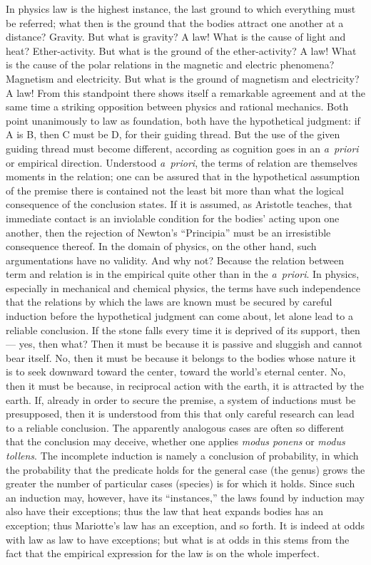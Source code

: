 \documentclass[12pt]{book}
\begin{document}
In physics law is the highest instance, the last ground to which everything must be
referred; what then is the ground that the bodies attract one another at a distance?
Gravity. But what is gravity? A law! What is the cause of light and heat? Ether-activity.
But what is the ground of the ether-activity? A law! What is the cause of the polar
relations in the magnetic and electric phenomena? Magnetism and electricity. But what
is the ground of magnetism and electricity? A law! From this standpoint there shows
itself a remarkable agreement and at the same time a striking opposition between physics
and rational mechanics. Both point unanimously to law as foundation, both have the
hypothetical judgment: if A is B, then C must be D, for their guiding thread. But the
use of the given guiding thread must become different, according as cognition goes in
an \textit{a~priori} or empirical direction. Understood \textit{a~priori}, the terms of
relation are themselves moments in the relation; one can be assured that in the
hypothetical assumption of the premise there is contained not the least bit more than
what the logical consequence of the conclusion states. If it is assumed, as Aristotle
teaches, that immediate contact is an inviolable condition for the bodies' acting upon
one another, then the rejection of Newton's ``Principia'' must be an irresistible
consequence thereof. In the domain of physics, on the other hand, such argumentations
have no validity. And why not? Because the relation between term and relation is in the
empirical quite other than in the \textit{a~priori}. In physics, especially in
mechanical and chemical physics, the terms have such independence that the relations by
which the laws are known must be secured by careful induction before the hypothetical
judgment can come about, let alone lead to a reliable conclusion. If the stone falls
every time it is deprived of its support, then --- yes, then what? Then it must be
because it is passive and sluggish and cannot bear itself. No, then it must be because
it belongs to the bodies whose nature it is to seek downward toward the center, toward
the world's eternal center. No, then it must be because, in reciprocal action with the
earth, it is attracted by the earth. If, already in order to secure the premise, a
system of inductions must be presupposed, then it is understood from this that only
careful research can lead to a reliable conclusion. The apparently analogous cases are
often so different that the conclusion may deceive, whether one applies \textit{modus
ponens} or \textit{modus tollens}. The incomplete induction is namely a conclusion of
probability, in which the probability that the predicate holds for the general case
(the genus) grows the greater the number of particular cases (species) is for which it
holds. Since such an induction may, however, have its ``instances,'' the laws found by
induction may also have their exceptions; thus the law that heat expands bodies has an
exception; thus Mariotte's law has an exception, and so forth. It is indeed at odds
with law as law to have exceptions; but what is at odds in this stems from the fact
that the empirical expression for the law is on the whole imperfect.
\end{document}
